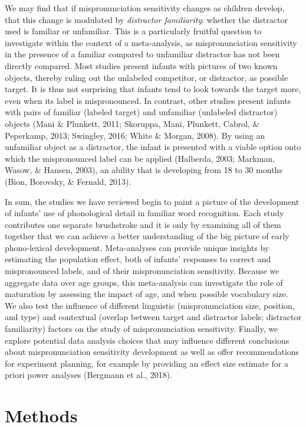 \documentclass[man]{apa6}
\begin{document}
We may find that if mispronunciation sensitivity changes as children develop, that this change is modulated by \emph{distractor familiarity}: whether the distractor used is familiar or unfamiliar. This is a particularly fruitful question to investigate within the context of a meta-analysis, as mispronunciation sensitivity in the presence of a familiar compared to unfamiliar distractor has not been directly compared. Most studies present infants with pictures of two known objects, thereby ruling out the unlabeled competitor, or distractor, as possible target. It is thus not surprising that infants tend to look towards the target more, even when its label is mispronounced. In contrast, other studies present infants with pairs of familiar (labeled target) and unfamiliar (unlabeled distractor) objects (Mani \& Plunkett, 2011; Skoruppa, Mani, Plunkett, Cabrol, \& Peperkamp, 2013; Swingley, 2016; White \& Morgan, 2008). By using an unfamiliar object as a distractor, the infant is presented with a viable option onto which the mispronounced label can be applied (Halberda, 2003; Markman, Wasow, \& Hansen, 2003), an ability that is developing from 18 to 30 months (Bion, Borovsky, \& Fernald, 2013).

In sum, the studies we have reviewed begin to paint a picture of the development of infants' use of phonological detail in familiar word recognition. Each study contributes one separate brushstroke and it is only by examining all of them together that we can achieve a better understanding of the big picture of early phono-lexical development. Meta-analyses can provide unique insights by estimating the population effect, both of infants' responses to correct and mispronounced labels, and of their mispronunciation sensitivity. Because we aggregate data over age groups, this meta-analysis can investigate the role of maturation by assessing the impact of age, and when possible vocabulary size. We also test the influence of different linguistic (mispronunciation size, position, and type) and contextual (overlap between target and distractor labels; distractor familiarity) factors on the study of mispronunciation sensitivity. Finally, we explore potential data analysis choices that may influence different conclusions about mispronunciation sensitivity development as well as offer recommendations for experiment planning, for example by providing an effect size estimate for a priori power analyses (Bergmann et al., 2018).

\hypertarget{methods}{%
\section{Methods}\label{methods}}
\end{document}
